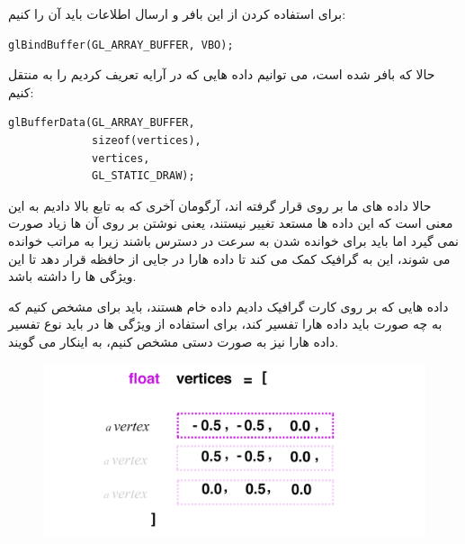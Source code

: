 \documentclass[a4paper, 12pt]{book}
\newcommand{\lrit}[1]{\lr{\textit{#1}}}
\begin{document}
    برای استفاده کردن از این بافر و ارسال اطلاعات باید آن را  کنیم:
    \begin{LTR}
    \small
        \begin{lstlisting}[style=C++Style,caption=\lrit{binding to target gl\_array\_buffer}]
glBindBuffer(GL_ARRAY_BUFFER, VBO);
        \end{lstlisting}
    \end{LTR}
    \normalsize
    \vspace*{0.3cm}

    حالا که بافر  شده است، می توانیم داده هایی که در آرایه  تعریف کردیم را به  منتقل کنیم:
        \begin{LTR}
    \small
        \begin{lstlisting}[style=C++Style,caption=\lrit{uploading data for static draw}]
glBufferData(GL_ARRAY_BUFFER,
             sizeof(vertices),
             vertices,
             GL_STATIC_DRAW);
        \end{lstlisting}
    \end{LTR}
    \normalsize
    \vspace*{0.3cm}

    حالا داده های ما بر روی  قرار گرفته اند، آرگومان آخری که به تابع بالا دادیم به این معنی است که این داده ها مستعد تغییر نیستند، یعنی نوشتن بر روی آن ها زیاد صورت نمی گیرد اما باید برای خوانده شدن به سرعت در دسترس باشند زیرا به مراتب خوانده می شوند، این به گرافیک کمک می کند تا داده هارا در جایی از حافظه قرار دهد تا این ویژگی ها را داشته باشد.

    داده هایی که بر روی کارت گرافیک دادیم داده خام هستند، باید برای  مشخص کنیم که به چه صورت باید داده هارا تفسیر کند، برای استفاده از ویژگی  ها در  باید نوع تفسیر داده هارا نیز به صورت دستی مشخص کنیم، به اینکار  می گویند.

    \vspace*{0.6cm}
\begin{figure}[ht]
    \centering
    \href{https://learnopengl.com}{
        \includegraphics[width=12cm]{images/shm-linking-vertex-attribute.png}
    }
    \caption{}
    \label{fig:my_label}
\end{figure}
\vspace*{0.6cm}
\end{document}
